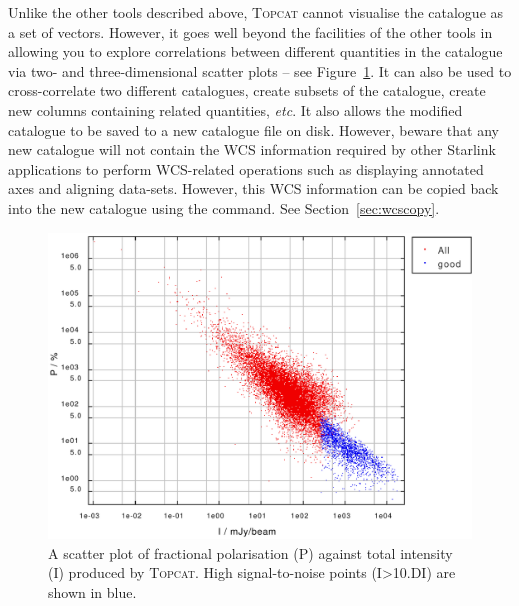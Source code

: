 Unlike the other tools described above, \textsc{Topcat} cannot visualise the
catalogue as a set of vectors. However, it goes well beyond the
facilities of the other tools in allowing you to explore correlations
between different quantities in the catalogue via two- and three-dimensional
scatter plots -- see Figure~\ref{fig:topcat}. It can also be used to
cross-correlate two different
catalogues, create subsets of the catalogue, create new columns
containing related quantities, \emph{etc}. It also allows the modified
catalogue to be saved to a new catalogue file on disk. However, beware
that any new catalogue will not contain the WCS information required
by other Starlink applications to perform WCS-related operations such as
displaying annotated axes and aligning data-sets. However, this WCS
information can be copied back into the new catalogue using the
 command. See Section~\ref{sec:wcscopy}.

\begin{figure}[t!]
\begin{center}
\includegraphics[width=0.75\linewidth]{sc22-topcat}
\caption [A TOPCAT scatter plot]{A scatter plot of fractional polarisation (P)
against total intensity (I) produced by \textsc{Topcat}. High signal-to-noise points
(I>10.DI) are shown in blue.\label{fig:topcat}}
\end{center}
\end{figure}

